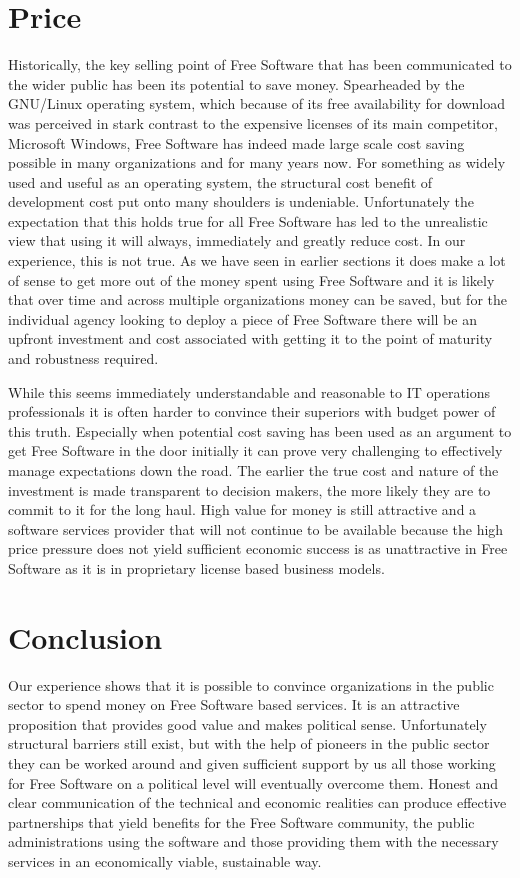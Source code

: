\section*{Price}

Historically, the key selling point of Free Software that has been communicated
to the wider public has been its potential to save money. Spearheaded by the
GNU/Linux operating system, which because of its free availability for
download was perceived in stark contrast to the expensive licenses of its main
competitor, Microsoft Windows, Free Software has indeed made large scale cost
saving possible in many organizations and for many years now. For something as
widely used and useful as an operating system, the structural cost benefit of
development cost put onto many shoulders is undeniable.  Unfortunately the
expectation that this holds true for all Free Software has led to the
unrealistic view that using it will always, immediately and greatly reduce
cost. In our experience, this is not true. As we have seen in earlier sections
it does make a lot of sense to get more out of the money spent using Free
Software and it is likely that over time and across multiple organizations
money can be saved, but for the individual agency looking to deploy a piece of
Free Software there will be an upfront investment and cost associated with
getting it to the point of maturity and robustness required.

While this seems immediately understandable and reasonable to IT operations
professionals it is often harder to convince their superiors with budget power
of this truth. Especially when potential cost saving has been used as an
argument to get Free Software in the door initially it can prove very
challenging to effectively manage expectations down the road. The earlier the
true cost and nature of the investment is made transparent to decision makers,
the more likely they are to commit to it for the long haul. High value
for money is still attractive and a software services provider that will
not continue to be available because the high price pressure does not yield
sufficient economic success is as unattractive in Free Software as it is in
proprietary license based business models.

\section*{Conclusion}

Our experience shows that it is possible to convince organizations in
the public sector to spend money on Free Software based services. It is
an attractive proposition that provides good value and makes political
sense. Unfortunately structural barriers still exist, but with the help
of pioneers in the public sector they can be worked around and given
sufficient support by us all those working for Free Software on a political
level will eventually overcome them. Honest and clear
communication of the technical and economic realities can produce
effective partnerships that yield benefits for the Free Software community,
the public administrations using the software and those providing them
with the necessary services in an economically viable, sustainable way.
